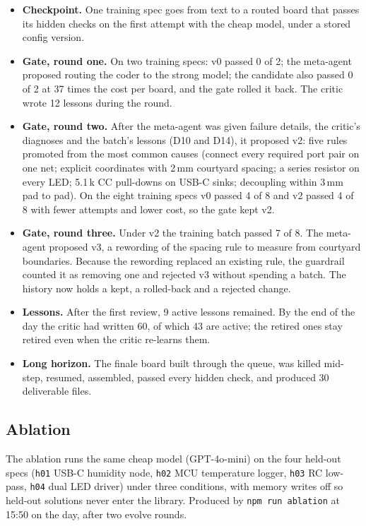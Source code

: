 \documentclass[11pt,a4paper]{article}
\newcommand{\code}[1]{\texttt{#1}}
\begin{document}
\begin{itemize}
  \item \textbf{Checkpoint.} One training spec goes from text to a routed board that passes its hidden checks on the first attempt with the cheap model, under a stored config version.
  \item \textbf{Gate, round one.} On two training specs: v0 passed 0 of 2; the meta-agent proposed routing the coder to the strong model; the candidate also passed 0 of 2 at 37 times the cost per board, and the gate rolled it back. The critic wrote 12 lessons during the round.
  \item \textbf{Gate, round two.} After the meta-agent was given failure details, the critic's diagnoses and the batch's lessons (D10 and D14), it proposed v2: five rules promoted from the most common causes (connect every required port pair on one net; explicit coordinates with 2\,mm courtyard spacing; a series resistor on every LED; 5.1\,k CC pull-downs on USB-C sinks; decoupling within 3\,mm pad to pad). On the eight training specs v0 passed 4 of 8 and v2 passed 4 of 8 with fewer attempts and lower cost, so the gate kept v2.
  \item \textbf{Gate, round three.} Under v2 the training batch passed 7 of 8. The meta-agent proposed v3, a rewording of the spacing rule to measure from courtyard boundaries. Because the rewording replaced an existing rule, the guardrail counted it as removing one and rejected v3 without spending a batch. The history now holds a kept, a rolled-back and a rejected change.
  \item \textbf{Lessons.} After the first review, 9 active lessons remained. By the end of the day the critic had written 60, of which 43 are active; the retired ones stay retired even when the critic re-learns them.
  \item \textbf{Long horizon.} The finale board built through the queue, was killed mid-step, resumed, assembled, passed every hidden check, and produced 30 deliverable files.
\end{itemize}

\subsection{Ablation}

The ablation runs the same cheap model (GPT-4o-mini) on the four held-out specs (\code{h01} USB-C humidity node, \code{h02} MCU temperature logger, \code{h03} RC low-pass, \code{h04} dual LED driver) under three conditions, with memory writes off so held-out solutions never enter the library. Produced by \code{npm run ablation} at 15:50 on the day, after two evolve rounds.
\end{document}
